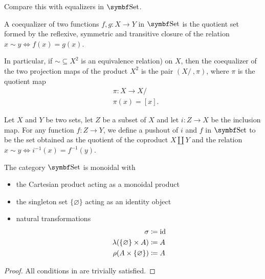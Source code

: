 \begin{proposition}
\begin{defenum}
    Compare this with equalizers in \( \Cat{Set} \).

     A coequalizer of two functions \( f, g: X \to Y \) in \( \Cat{Set} \) is the quotient set formed by the reflexive, symmetric and transitive closure of the relation \( x \sim y \iff f(x) = g(x) \).

    In particular, if \( \sim \subseteq X^2 \) is an equivalence relation) on \( X \), then the coequalizer of the two projection maps of the product \( X^2 \) is the pair \( (X / ~, \pi) \), where \( \pi \) is the quotient map
    \begin{align*}
      &\pi: X \to X / ~ \\
      &\pi(x) = [x].
    \end{align*}

     Let \( X \) and \( Y \) be two sets, let \( Z \) be a subset of \( X \) and let \( i: Z \to X \) be the inclusion map. For any function \( f: Z \to Y \), we define a pushout of \( i \) and \( f \) in \( \Cat{Set} \) to be the set obtained as the quotient of the coproduct \( X \coprod Y \) and the relation \( x \sim y \iff i^{-1}(x) = f^{-1}(y) \).
  \end{defenum}
\end{proposition}

\begin{proposition}\label{thm:set_is_monoidal}
  The category \( \Cat{Set} \) is monoidal with
  \begin{itemize}
    \item the Cartesian product acting as a monoidal product
    \item the singleton set \( \{ \varnothing \} \) acting as an identity object
    \item natural transformations
    \begin{align*}
      \sigma &\coloneqq \operatorname{id} \\
      \lambda(\{ \varnothing \} \times A) &\coloneqq A \\
      \rho(A \times \{ \varnothing \}) &\coloneqq A
    \end{align*}
  \end{itemize}
\end{proposition}
\begin{proof}
  All conditions in  are trivially satisfied.
\end{proof}
